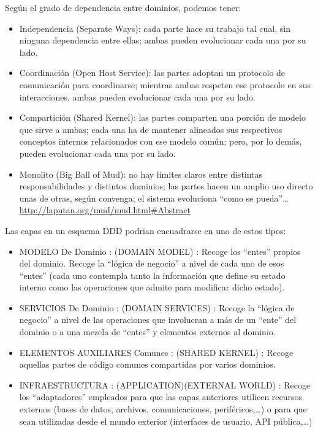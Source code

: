 \documentclass[spanish,12pt,a4paper,final,oneside]{book}
\begin{document}
Según el grado de dependencia entre dominios, podemos tener:
\begin{itemize}

\item Independencia (Separate Ways): cada parte hace su trabajo tal cual, sin ninguna dependencia entre ellas; ambas pueden evolucionar cada una por su lado.

\item Coordinación (Open Host Service): las partes adoptan un protocolo de comunicación para coordinarse; mientras ambas respeten ese protocolo en sus interacciones, ambas pueden evolucionar cada una por su lado.

\item Compartición (Shared Kernel): las partes comparten una porción de modelo que sirve a ambas; cada una ha de mantener alineados sus respectivos conceptos internos relacionados con ese modelo común; pero, por lo demás, pueden evolucionar cada una por su lado.

\item Monolito (Big Ball of Mud):  no hay límites claros entre distintas responsabilidades y distintos dominios; las partes hacen un amplio uso directo unas de otras, según convenga; el sistema evoluciona ``como se pueda''\ldots
\\ {\footnotesize \url{http://laputan.org/mud/mud.html#Abstract}}

\end{itemize}

\newpage
Las capas en un esquema DDD podrian encuadrarse en uno de estos tipos:
\begin{itemize}
\item MODELO De Dominio : (DOMAIN MODEL) : Recoge los ``entes'' propios del dominio. Recoge la ``lógica de negocio'' a nivel de cada uno de esos ``entes'' (cada uno contempla tanto la información que define su estado interno como las operaciones que admite para modificar dicho estado).
\item SERVICIOS De Dominio : (DOMAIN SERVICES) : Recoge la ``lógica de negocio'' a nivel de las operaciones que involucran a más de un ``ente'' del dominio o a una mezcla de ``entes'' y elementos externos al dominio.
\item ELEMENTOS AUXILIARES Comunes : (SHARED KERNEL) : Recoge aquellas partes de código comunes compartidas por varios dominios.
\item INFRAESTRUCTURA : (APPLICATION)(EXTERNAL WORLD) : Recoge los ``adaptadores'' empleados para que las  capas anteriores utilicen recursos externos (bases de datos, archivos, comunicaciones, periféricos,\ldots) o para que sean utilizadas desde el mundo exterior (interfaces de usuario, API pública,\ldots)
\end{itemize}
\end{document}
